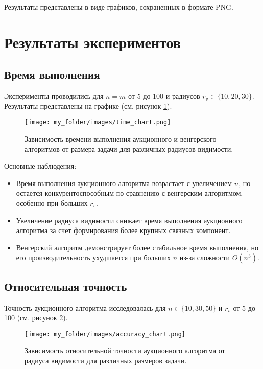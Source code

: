 Результаты представлены в виде графиков, сохраненных в формате PNG.

\section{Результаты экспериментов}

\subsection{Время выполнения}

\vspace{0.3cm}

Эксперименты проводились для \( n = m \) от 5 до 100 и радиусов \( r_v \in \{10, 20, 30\} \). Результаты представлены на графике (см. рисунок \ref{fig:time_chart}).

\begin{figure}[h]
    \centering
    \texttt{[image: my\_folder/images/time\_chart.png]}
    \caption{Зависимость времени выполнения аукционного и венгерского алгоритмов от размера задачи для различных радиусов видимости.}
    \label{fig:time_chart}
\end{figure}

Основные наблюдения:
\begin{itemize}
    \item Время выполнения аукционного алгоритма возрастает с увеличением \( n \), но остается конкурентоспособным по сравнению с венгерским алгоритмом, особенно при больших \( r_v \).
    \item Увеличение радиуса видимости снижает время выполнения аукционного алгоритма за счет формирования более крупных связных компонент.
    \item Венгерский алгоритм демонстрирует более стабильное время выполнения, но его производительность ухудшается при больших \( n \) из-за сложности \( O(n^3) \).
\end{itemize}



\subsection{Относительная точность}
Точность аукционного алгоритма исследовалась для \( n \in \{10, 30, 50\} \) и \( r_v \) от 5 до 100 (см. рисунок \ref{fig:accuracy_chart}).

\begin{figure}[h]
    \centering
    \texttt{[image: my\_folder/images/accuracy\_chart.png]}
    \caption{Зависимость относительной точности аукционного алгоритма от радиуса видимости для различных размеров задачи.}
    \label{fig:accuracy_chart}
\end{figure}


